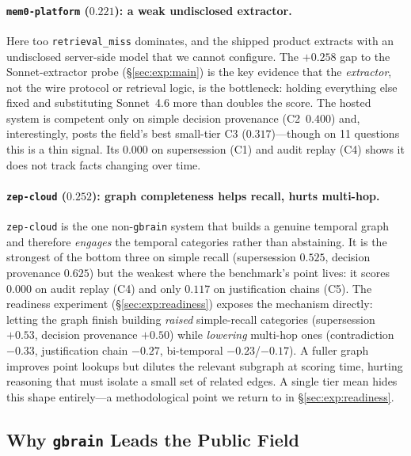 \paragraph{\texttt{mem0-platform} ($0.221$): a weak undisclosed extractor.}
Here too \texttt{retrieval\_miss} dominates, and the shipped product
extracts with an undisclosed server-side model that we cannot configure. The
$+0.258$ gap to the Sonnet-extractor probe (\S\ref{sec:exp:main}) is the key
evidence that the \emph{extractor}, not the wire protocol or retrieval logic, is
the bottleneck: holding everything else fixed and substituting Sonnet~4.6 more
than doubles the score. The hosted system is competent only on simple decision
provenance (C2~$0.400$) and, interestingly, posts the field's best small-tier C3
($0.317$)---though on 11 questions this is a thin signal. Its $0.000$ on
supersession (C1) and audit replay (C4) shows it does not track facts changing
over time.

\paragraph{\texttt{zep-cloud} ($0.252$): graph completeness helps recall, hurts
multi-hop.}
\texttt{zep-cloud} is the one non-\texttt{gbrain} system that builds a genuine
temporal graph and therefore \emph{engages} the temporal categories rather than
abstaining. It is the strongest of the bottom three on simple recall
(supersession $0.525$, decision provenance $0.625$) but the weakest where the
benchmark's point lives: it scores $0.000$ on audit replay (C4) and only $0.117$
on justification chains (C5). The readiness experiment
(\S\ref{sec:exp:readiness}) exposes the mechanism directly: letting the graph
finish building \emph{raised} simple-recall categories (supersession $+0.53$,
decision provenance $+0.50$) while \emph{lowering} multi-hop ones (contradiction
$-0.33$, justification chain $-0.27$, bi-temporal $-0.23$/$-0.17$). A fuller
graph improves point lookups but dilutes the relevant subgraph at scoring time,
hurting reasoning that must isolate a small set of related edges. A single tier
mean hides this shape entirely---a methodological point we return to in
\S\ref{sec:exp:readiness}.

\subsection{Why \texttt{gbrain} Leads the Public Field}
\label{sec:exp:gbrain}

